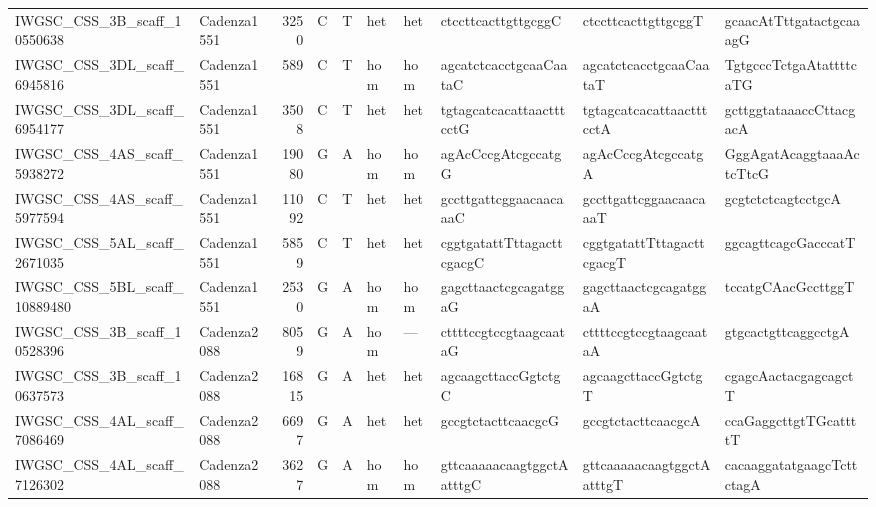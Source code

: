 \begin{longtable}{llrlllllll}
 IWGSC\_CSS\_3B\_scaff\_10550638  & Cadenza1551 &       3250 & C         & T        & het            & het         & ctccttcacttgttgcggC       & ctccttcacttgttgcggT       & gcaacAtTttgatactgcaaagG   \\
 IWGSC\_CSS\_3DL\_scaff\_6945816  & Cadenza1551 &        589 & C         & T        & hom            & hom         & agcatctcacctgcaaCaataC    & agcatctcacctgcaaCaataT    & TgtgcccTctgaAtattttcaTG   \\
 IWGSC\_CSS\_3DL\_scaff\_6954177  & Cadenza1551 &       3508 & C         & T        & het            & het         & tgtagcatcacattaactttcctG  & tgtagcatcacattaactttcctA  & gcttggtataaaccCttacgacA   \\
 IWGSC\_CSS\_4AS\_scaff\_5938272  & Cadenza1551 &      19080 & G         & A        & hom            & hom         & agAcCccgAtcgccatgG        & agAcCccgAtcgccatgA        & GggAgatAcaggtaaaActcTtcG  \\
 IWGSC\_CSS\_4AS\_scaff\_5977594  & Cadenza1551 &      11092 & C         & T        & het            & het         & gccttgattcggaacaacaaaC    & gccttgattcggaacaacaaaT    & gcgtctctcagtcctgcA        \\
 IWGSC\_CSS\_5AL\_scaff\_2671035  & Cadenza1551 &       5859 & C         & T        & het            & het         & cggtgatattTttagacttcgacgC & cggtgatattTttagacttcgacgT & ggcagttcagcGacccatT       \\
 IWGSC\_CSS\_5BL\_scaff\_10889480 & Cadenza1551 &       2530 & G         & A        & hom            & hom         & gagcttaactcgcagatggaG     & gagcttaactcgcagatggaA     & tccatgCAacGccttggT        \\
 IWGSC\_CSS\_3B\_scaff\_10528396  & Cadenza2088 &       8059 & G         & A        & hom            & ---         & cttttccgtccgtaagcaataG    & cttttccgtccgtaagcaataA    & gtgcactgttcaggcctgA       \\
 IWGSC\_CSS\_3B\_scaff\_10637573  & Cadenza2088 &      16815 & G         & A        & het            & het         & agcaagcttaccGgtctgC       & agcaagcttaccGgtctgT       & cgagcAactacgagcagctT      \\
 IWGSC\_CSS\_4AL\_scaff\_7086469  & Cadenza2088 &       6697 & G         & A        & het            & het         & gccgtctacttcaacgcG        & gccgtctacttcaacgcA        & ccaGaggcttgtTGcattttT     \\
 IWGSC\_CSS\_4AL\_scaff\_7126302  & Cadenza2088 &       3627 & G         & A        & hom            & hom         & gttcaaaaacaagtggctAatttgC & gttcaaaaacaagtggctAatttgT & cacaaggatatgaagcTcttctagA \\

\end{longtable}
